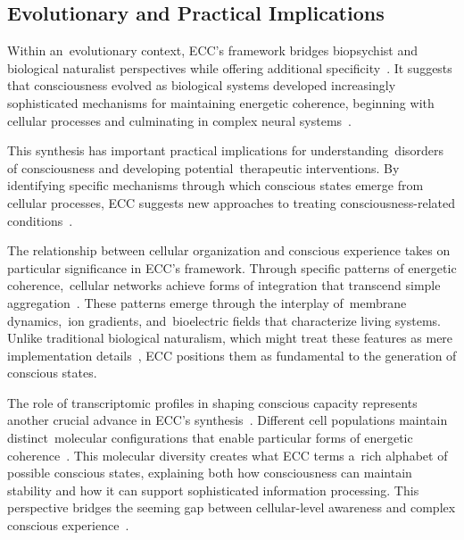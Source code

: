 \subsection*{Evolutionary and Practical Implications}

Within an~evolutionary context, ECC's framework bridges biopsychist and biological naturalist perspectives while offering additional specificity~\cite{varela1997patterns,margulis2000life}. It suggests that consciousness evolved as biological systems developed increasingly sophisticated mechanisms for maintaining energetic coherence, beginning with cellular processes and culminating in complex neural systems~\cite{deacon2011incomplete,dupre2012processes}.

This synthesis has important practical implications for understanding~disorders of consciousness and developing potential~therapeutic interventions. By identifying specific mechanisms through which conscious states emerge from cellular processes, ECC suggests new approaches to treating consciousness-related conditions~\cite{thompson2010mind}.

The relationship between cellular organization and conscious experience takes on particular significance in ECC's framework. Through specific patterns of energetic coherence,~cellular networks achieve forms of integration that transcend simple aggregation~\cite{lyon2015cognitive,levin2020revisiting}. These patterns emerge through the interplay of~membrane dynamics,~ion gradients, and~bioelectric fields that characterize living systems. Unlike traditional biological naturalism, which might treat these features as mere implementation details~\cite{searle2017biological}, ECC positions them as fundamental to the generation of conscious states.

The role of transcriptomic profiles in shaping conscious capacity represents another crucial advance in ECC's synthesis~\cite{Tasic2018,Hawrylycz2012,Giaume2010}. Different cell populations maintain distinct~molecular configurations that enable particular forms of energetic coherence~\cite{shapiro2007bacteria,levin2019computational}. This molecular diversity creates what ECC terms a~rich alphabet of possible conscious states, explaining both how consciousness can maintain stability and how it can support sophisticated information processing. This perspective bridges the seeming gap between cellular-level awareness and complex conscious experience~\cite{van2006principles,thompson2007mind}.

